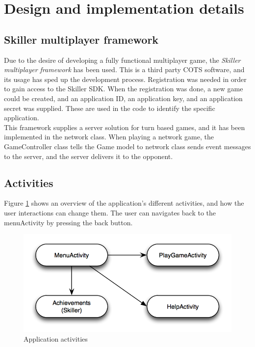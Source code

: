 \section{Design and implementation details}

\subsection{Skiller multiplayer framework}
Due to the desire of developing a fully functional multiplayer game, the \emph{Skiller multiplayer framework} \cite{skiller} has been used. This is a third party COTS software, and its usage has sped up the development process. Registration was needed in order to gain access to the Skiller SDK. When the registration was done, a new game could be created, and an application ID, an application key, and an application secret was supplied. These are used in the code to identify the specific application. \\

This framework supplies a server solution for turn based games, and it has been implemented in the network class. When playing a network game, the GameController class tells the Game model to  network class sends event messages to the server, and the server delivers it to the opponent.

\subsection{Activities}
Figure \ref{fig:activities} shows an overview of the application's different activities, and how the user interactions can change them. The user can navigates back to the menuActivity by pressing the back button.\\

\begin{figure}[H]
\includegraphics[width=1\textwidth]{Images/activities}
\caption{Application activities}
\label{fig:activities}
\end{figure}

